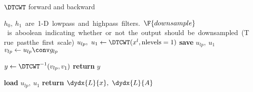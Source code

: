 \begin{algorithm}[tb]
\caption{$\DTCWT$ forward and backward}\label{alg:ch6:inv}
\begin{algorithmic}[1]
\mbox{$h_0,\ h_1$ are 1-D lowpass and highpass filters. $\F{downsample}$ is a\\ 
  boolean indicating whether or not the output should be downsampled (True past
\\ the first scale)}
\State $u_{lp},\ u_{1} \gets \DTCWT(x^l, \mbox{nlevels}=1) $ 
  \State \textbf{save} $u_{lp},\ u_{1}$ 
  \State $v_{lp} \gets u_{lp} \conv g_{lp}$ 
  \State {}
  \EndFor
  \State $y \gets \DTCWT^{-1}(v_{lp}, v_{1})$
  \State \textbf{return} $y$
\EndProcedure
\end{algorithmic}\vspace{10pt}
\begin{algorithmic}[1]
  \State \textbf{load} $u_{lp},\ u_1$
  \State \textbf{return} $\dydx{L}{x},\ \dydx{L}{A}$
\EndProcedure
\end{algorithmic}
\end{algorithm}


